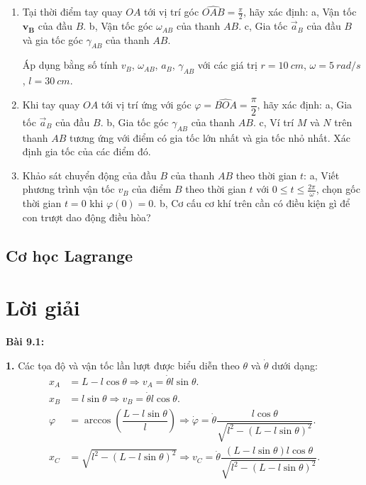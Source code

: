 \begin{enumerate}
	\item Tại thời điểm tay quay \(OA\) tới vị trí góc \(\widehat{OAB}= \frac{\pi}{2}\), hãy xác định:
        \subitem a, Vận tốc \(\mathbf{v_B}\) của đầu \(B\).
        \subitem b, Vận tốc góc \(\omega_{AB}\) của thanh \(AB\).
        \subitem c, Gia tốc \(\vec{a}_B\) của đầu \(B\) và gia tốc góc \(\gamma_{AB}\) của thanh \(AB\).
        
Áp dụng bằng số tính \(v_B\), \(\omega_{AB}\), \(a_B\), \(\gamma_{AB}\) với các giá trị \(r = \SI{10}{cm}\), \(\omega = \SI{5}{rad/s}\), \(l = \SI{30}{cm}\).
    \item Khi tay quay \(OA\) tới vị trí ứng với góc \(\varphi = \widehat{BOA} = \dfrac{\pi}{2}\), hãy xác định: 
        \subitem a, Gia tốc \(\vec{a}_B\) của đầu \(B\).
        \subitem b, Gia tốc góc \(\gamma_{AB}\) của thanh \(AB\).
        \subitem c, Ví trí \(M\) và \(N\) trên thanh \(AB\) tương ứng với điểm có gia tốc lớn nhất và gia tốc nhỏ nhất. Xác định gia tốc của các điểm đó.
    \item Khảo sát chuyển động của đầu \(B\) của thanh $AB$ theo thời gian \(t\):
        \subitem a, Viết phương trình vận tốc \(v_B\) của điểm $B$ theo thời gian \(t\) với \(0 \le t \le \frac{2 \pi}{\omega}\), chọn gốc thời gian \(t = 0\) khi \(\varphi (0) = 0\).
        \subitem b, Cơ cấu cơ khí trên cần có điều kiện gì để con trượt dao động điều hòa?
\end{enumerate}

\subsection*{Cơ học Lagrange}


\section{Lời giải}

\textbf{Bài 9.1:} 

\textbf{1.} Các tọa độ và vận tốc lần lượt được biểu diễn theo $\theta$ và $\dot{\theta}$ dưới dạng:
\begin{align*}
    x_A &= L - l \cos \theta \Rightarrow v_A= \dot{\theta} l \sin \theta. \\
    x_B &= l \sin \theta \Rightarrow v_B = \dot{\theta} l \cos \theta. \\
    \varphi &= \arccos \left( \dfrac{L - l \sin \theta}{l} \right) \Rightarrow \dot{\varphi} = \dot{\theta} \dfrac{l \cos \theta}{\sqrt{l^2 - \left( L - l \sin \theta \right)^2}}. \\
    x_C &= \sqrt{l^2 - \left( L - l \sin \theta \right)^2} \Rightarrow v_C = \dot{\theta} \dfrac{(L-l \sin \theta) l \cos \theta}{\sqrt{l^2 - \left( L - l \sin \theta \right)^2}}.
\end{align*}

